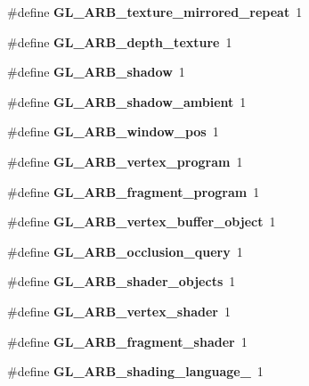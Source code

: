 \begin{DoxyCompactItemize}
\item 
\#define {\bfseries G\+L\+\_\+\+A\+R\+B\+\_\+texture\+\_\+mirrored\+\_\+repeat}~1\label{_s_d_l__opengl_8h_af4bb1bdda277066491b8557de9306bb9}

\item 
\#define {\bfseries G\+L\+\_\+\+A\+R\+B\+\_\+depth\+\_\+texture}~1\label{_s_d_l__opengl_8h_a7fd680d43589db44c71de25015f07df2}

\item 
\#define {\bfseries G\+L\+\_\+\+A\+R\+B\+\_\+shadow}~1\label{_s_d_l__opengl_8h_a7536a76a0ec993ff52606fdf34897d61}

\item 
\#define {\bfseries G\+L\+\_\+\+A\+R\+B\+\_\+shadow\+\_\+ambient}~1\label{_s_d_l__opengl_8h_aca5766bd9b28140fe2e176c33bf033f2}

\item 
\#define {\bfseries G\+L\+\_\+\+A\+R\+B\+\_\+window\+\_\+pos}~1\label{_s_d_l__opengl_8h_aefd5aad050e1dcadaac885d7a621c3a1}

\item 
\#define {\bfseries G\+L\+\_\+\+A\+R\+B\+\_\+vertex\+\_\+program}~1\label{_s_d_l__opengl_8h_a57697ccb2797770a75667f8ed104aa41}

\item 
\#define {\bfseries G\+L\+\_\+\+A\+R\+B\+\_\+fragment\+\_\+program}~1\label{_s_d_l__opengl_8h_a01a44bfe9e6da873e19ad87583c6b04d}

\item 
\#define {\bfseries G\+L\+\_\+\+A\+R\+B\+\_\+vertex\+\_\+buffer\+\_\+object}~1\label{_s_d_l__opengl_8h_a99fc8b180717c73753c461098e37c452}

\item 
\#define {\bfseries G\+L\+\_\+\+A\+R\+B\+\_\+occlusion\+\_\+query}~1\label{_s_d_l__opengl_8h_a21aae7ffb3cca75daf035c92d2ef9aa8}

\item 
\#define {\bfseries G\+L\+\_\+\+A\+R\+B\+\_\+shader\+\_\+objects}~1\label{_s_d_l__opengl_8h_a70f2e5381f5b9fc88fd7617e05020e86}

\item 
\#define {\bfseries G\+L\+\_\+\+A\+R\+B\+\_\+vertex\+\_\+shader}~1\label{_s_d_l__opengl_8h_adafcade072d8d1f04d9e219c6496e4a6}

\item 
\#define {\bfseries G\+L\+\_\+\+A\+R\+B\+\_\+fragment\+\_\+shader}~1\label{_s_d_l__opengl_8h_a180d9703bac6a79edefaf9015c9dab4a}

\item 
\#define {\bfseries G\+L\+\_\+\+A\+R\+B\+\_\+shading\+\_\+language\+\_}~1\label{_s_d_l__opengl_8h_a58493e4b7f1f99171d3c1f762bc9875e}


\end{DoxyCompactItemize}
